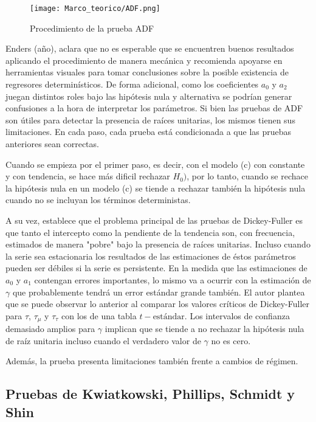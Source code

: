 \begin{figure}[!htbp]
    \centering
    \caption{Procedimiento de la prueba ADF}
    \texttt{[image: Marco\_teorico/ADF.png]}
    \label{fig:enter-label}
\end{figure}
\newpage

Enders (año), aclara que no es esperable que se encuentren buenos resultados aplicando el procedimiento de manera mecánica y recomienda apoyarse en herramientas visuales para tomar conclusiones sobre la posible existencia de regresores determinísticos. De forma adicional, como los coeficientes $a_0$ y $a_2$ juegan distintos roles bajo las hipótesis nula y alternativa se podrían generar confusiones a la hora de interpretar los parámetros. Si bien las pruebas de ADF son útiles para detectar la presencia de raíces unitarias, los mismos tienen sus limitaciones. En cada paso, cada prueba está condicionada a que las pruebas anteriores sean correctas. 

Cuando se empieza por el primer paso, es decir, con el modelo (c) con constante y con tendencia, se hace más dificil rechazar $H_0)$, por lo tanto, cuando se rechace la hipótesis nula en un modelo (c) se tiende a rechazar también la hipótesis nula cuando no se incluyan los términos deterministas. 

A su vez, establece que el problema principal de las pruebas de Dickey-Fuller es que tanto el intercepto como la pendiente de la tendencia son, con frecuencia, estimados de manera "pobre"  bajo la presencia de raíces unitarias. Incluso cuando la serie sea estacionaria los resultados de las estimaciones de éstos parámetros pueden ser débiles si la serie es persistente. En la medida que las estimaciones de $a_0$ y $a_1$ contengan errores importantes, lo mismo va a ocurrir con la estimación de $\gamma$ que probablemente tendrá un error estándar grande también. El autor plantea que se puede observar lo anterior al comparar los valores críticos de Dickey-Fuller para $\tau$, $\tau_{\mu}$ y $\tau_{\tau}$ con los de una tabla $t-\text{estándar}$. Los intervalos de confianza demasiado amplios para $\gamma$ implican que se tiende a no rechazar la hipótesis nula de raíz unitaria incluso cuando el verdadero valor de $\gamma$ no es cero.

Además, la prueba presenta limitaciones también frente a cambios de régimen.






\newpage
\subsection{Pruebas de Kwiatkowski, Phillips, Schmidt y Shin}
\label{sec: KPSS}

